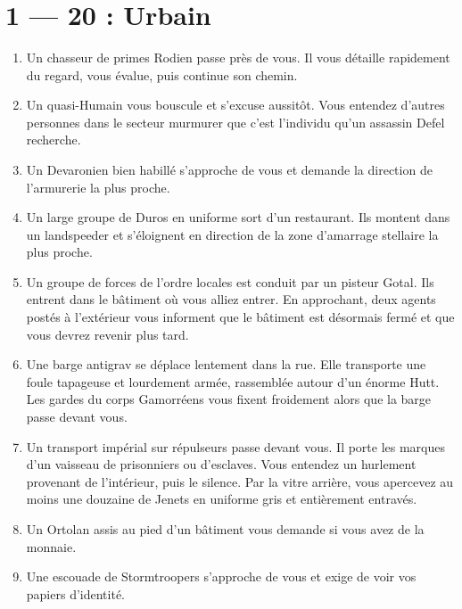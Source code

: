 \documentclass{article}
\begin{document}
\title{\vspace{-0.5cm}{\Huge Rencontres} \vspace{-1cm}}

\date{}

\maketitle

\section*{1 --- 20 : Urbain}
\begin{enumerate}

	\item Un chasseur de primes Rodien passe près de vous. Il vous détaille rapidement du regard, vous évalue, puis continue son chemin.
	\item Un quasi-Humain vous bouscule et s’excuse aussitôt. Vous entendez d’autres personnes dans le secteur murmurer que c’est l’individu qu’un assassin Defel recherche.
	\item Un Devaronien bien habillé s’approche de vous et demande la direction de l’armurerie la plus proche.
	\item Un large groupe de Duros en uniforme sort d’un restaurant. Ils montent dans un landspeeder et s’éloignent en direction de la zone d’amarrage stellaire la plus proche.
	\item Un groupe de forces de l’ordre locales est conduit par un pisteur Gotal. Ils entrent dans le bâtiment où vous alliez entrer. En approchant, deux agents postés à l’extérieur vous informent que le bâtiment est désormais fermé et que vous devrez revenir plus tard.
	\item Une barge antigrav se déplace lentement dans la rue. Elle transporte une foule tapageuse et lourdement armée, rassemblée autour d’un énorme Hutt. Les gardes du corps Gamorréens vous fixent froidement alors que la barge passe devant vous.
	\item Un transport impérial sur répulseurs passe devant vous. Il porte les marques d’un vaisseau de prisonniers ou d’esclaves. Vous entendez un hurlement provenant de l’intérieur, puis le silence. Par la vitre arrière, vous apercevez au moins une douzaine de Jenets en uniforme gris et entièrement entravés.
	\item Un Ortolan assis au pied d’un bâtiment vous demande si vous avez de la monnaie.
	\item Une escouade de Stormtroopers s’approche de vous et exige de voir vos papiers d’identité.

\end{enumerate}
\end{document}
